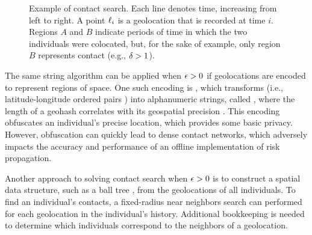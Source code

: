 \begin{figure}[htbp]
\centering
{}
\caption[Example of contact search]{Example of contact search. Each line denotes time, increasing from left to right. A point $\ell_i$ is a geolocation that is recorded at time $i$. Regions $A$ and $B$ indicate periods of time in which the two individuals were colocated, but, for the sake of example, only region $B$ represents contact (e.g., $\delta > 1$).}
\label{fig:contact-search}
\end{figure}

The same string algorithm can be applied when $\epsilon > 0$ if geolocations are encoded to represent regions of space. One such encoding is , which transforms  (i.e., latitude-longitude ordered pairs \citep[p. 5]{Sickle2004}) into alphanumeric strings, called , where the length of a geohash correlates with its geospatial precision \citep{Morton1966}. This encoding obfuscates an individual's precise location, which provides some basic privacy. However, obfuscation can quickly lead to dense contact networks, which adversely impacts the accuracy and performance of an offline implementation of risk propagation.

Another approach to solving contact search when $\epsilon > 0$ is to construct a spatial data structure, such as a ball tree \citep{Omohundro1989, Kibriya2007}, from the geolocations of all individuals. To find an individual's contacts, a fixed-radius near neighbors search \citep{Bentley1975, Brin1995} can performed for each geolocation in the individual's history. Additional bookkeeping is needed to determine which individuals correspond to the neighbors of a geolocation. 

